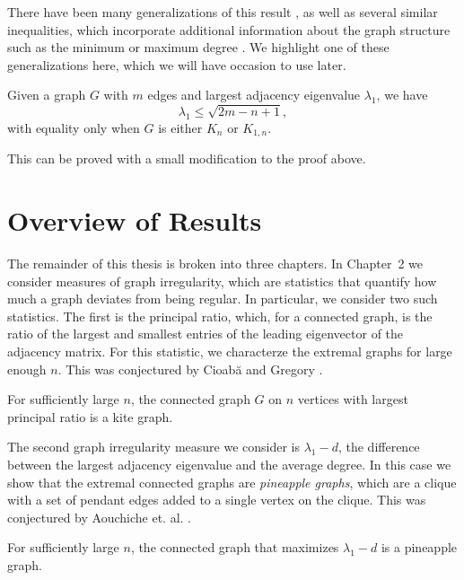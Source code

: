 There have been many generalizations of this result \cite{Friedland1988, Hong1988, HongEtAl2001, Nikiforov2002, DasKumar2004},
as well as several
similar inequalities, which incorporate additional information about the graph structure
such as the minimum or maximum degree \cite{FavaronMaheoSacle1993, BermanZhang2001, Nikiforov2006Walks}.  We highlight one of these generalizations here, which we will have occasion to use later.

\begin{theorem}
  Given a graph $G$ with $m$ edges and largest adjacency eigenvalue $\lambda_1$, we have
  \[ \lambda_1 \leq \sqrt{2m - n + 1} ,\]
  with equality only when $G$ is either $K_n$ or $K_{1,n}$.
\end{theorem}
\noindent This can be proved with a small modification to the proof above.  


\section{Overview of Results}

The remainder of this thesis is broken into three chapters.  In Chapter~2 we consider
measures of graph irregularity, which are statistics that quantify how much a graph deviates
from being regular.
In particular, we consider two such statistics. The first is the principal ratio, which,
for a connected graph, is the ratio of the largest and smallest entries of the leading
eigenvector of the adjacency matrix.  For this statistic, we characterze the extremal
graphs for large enough $n$.  This was conjectured by Cioab\u{a} and Gregory
\cite{CioabaGregory2007}.
\begin{theorem}\label{main_theorem}
  For sufficiently large $n$, the connected graph $G$ on $n$
  vertices with largest principal ratio is a kite graph.
\end{theorem}
\noindent The second graph irregularity measure we consider is  $\lambda_1 - d$,
the difference between the largest adjacency eigenvalue and the average degree.
In this case we show that the extremal connected graphs are \textit{pineapple graphs}, which
are a clique with a set of pendant edges added to a single vertex on the clique.
This was conjectured by Aouchiche et. al. \cite{AouchicheEtAl2008}.
\begin{theorem}
  For sufficiently large $n$, the connected graph that maximizes $\lambda_1 - d$
  is a pineapple graph.
\end{theorem}



